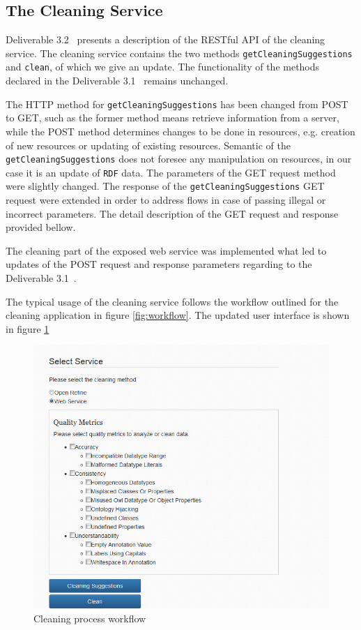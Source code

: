 \subsection{The Cleaning Service}
\label{sec:cleaningService}

Deliverable 3.2~\cite{d3.2} presents a description of the RESTful API of the cleaning service. 
The cleaning service contains the two methods \texttt{getCleaningSuggestions} and \texttt{clean}, of which we give an update.
The functionality of the methods  declared in the Deliverable 3.1~\cite{d3.1} remains unchanged.

The HTTP method for \texttt{getCleaningSuggestions} has been changed from POST to GET, such as the former method means retrieve information from a server, while the POST method determines changes to be done in resources, e.g. creation of new resources or updating of existing resources. Semantic of the \texttt{getCleaningSuggestions} does not foresee any manipulation on resources, in our case it is an update of \texttt{RDF} data.
The parameters of the GET request method were slightly changed. The response of the \texttt{getCleaningSuggestions} GET request were extended in order to address flows in case of passing illegal or incorrect parameters. The detail description of the GET request and response provided bellow.

The cleaning part of the exposed web service was implemented what led to updates of the POST request and response parameters regarding to the Deliverable 3.1~\cite{d3.1}.


The typical usage of the cleaning service follows the workflow outlined for the cleaning application in figure \ref{fig:workflow}.
The updated user interface is shown in figure \ref{fig:ui}

\begin{figure}[ht!]
\centering
\includegraphics[width=\textwidth]{figures/WebService.png}
\caption{Cleaning process workflow}
\label{fig:ui}
\end{figure}





